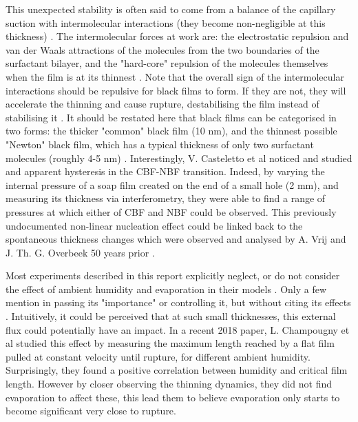\documentclass[a4paper,12pt]{article}
\numberwithin{equation}{section}
\numberwithin{figure}{section}
\numberwithin{table}{section}
\begin{document}
This unexpected stability is often said to come from a balance of the capillary suction with intermolecular interactions (they become non-negligible at this thickness) \cite{Breward2002, ChampougnyEvap2018, Cantat2010, Vrij1968, VrijDiscussion1966}. The intermolecular forces at work are: the electrostatic repulsion and van der Waals attractions of the molecules from the two boundaries of the surfactant bilayer, and the "hard-core" repulsion of the molecules themselves when the film is at its thinnest \cite{Casteletto2003}. Note that the overall sign of the intermolecular interactions should be repulsive for black films to form. If they are not, they will accelerate the thinning and cause rupture, destabilising the film instead of stabilising it \cite{VrijDiscussion1966, Langevin1994, Debregeas1998}. It should be restated here that black films can be categorised in two forms: the thicker "common" black film (10 nm), and the thinnest possible "Newton" black film, which has a typical thickness of only two surfactant molecules (roughly 4-5 nm) \cite{Casteletto2003, Seung2006}. Interestingly, V. Casteletto et al \cite{Casteletto2003} noticed and studied and apparent hysteresis in the CBF-NBF transition. Indeed, by varying the internal pressure of a soap film created on the end of a small hole (2 mm), and measuring its thickness via interferometry, they were able to find a range of pressures at which either of CBF and NBF could be observed. This previously undocumented non-linear nucleation effect could be linked back to the spontaneous thickness changes which were observed and analysed by A. Vrij and J. Th. G. Overbeek 50 years prior \cite{Vrij1968}.

Most experiments described in this report explicitly neglect, or do not consider the effect of ambient humidity and evaporation in their models \cite{Manev1974, Zheng1983}. Only a few mention in passing its "importance" or controlling it, but without citing its effects \cite{Langevin1994}. Intuitively, it could be perceived that at such small thicknesses, this external flux could potentially have an impact. In a recent 2018 paper, L. Champougny et al \cite{ChampougnyEvap2018} studied this effect by measuring the maximum length reached by a flat film pulled at constant velocity until rupture, for different ambient humidity. Surprisingly, they found a positive correlation between humidity and critical film length. However by closer observing the thinning dynamics, they did not find evaporation to affect these, this lead them to believe evaporation only starts to become significant very close to rupture.
\end{document}

